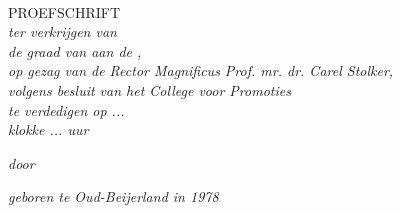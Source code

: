 \documentclass[11pt, a4paper, oneside]{Thesis} %
\begin{document}
\begin{titlepage}
\begin{center}

{\huge \bfseries \ttitle}\\[0.4cm] %

\textsc{\Large PROEFSCHRIFT}\\[0.5cm] %

\large \textit{ter verkrijgen van\\
de graad van \degreename{} aan de \univname,\\
op gezag van de Rector Magnificus Prof. mr. dr. Carel Stolker,\\
volgens besluit van het College voor Promoties\\
te verdedigen op ...\\
klokke ... uur}

\large \textit{door}

\authornames

\large \textit{geboren te Oud-Beijerland in 1978}

%
 
% 
 
 
\vfill
\end{center}

\end{titlepage}
\end{document}
